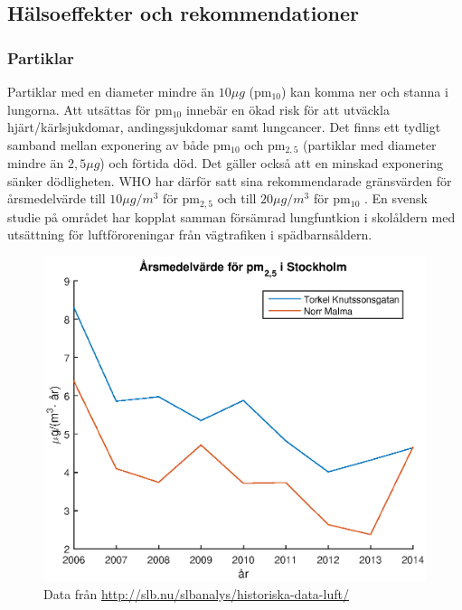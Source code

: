 \subsection{Hälsoeffekter och rekommendationer}
\subsubsection{Partiklar}
Partiklar med en diameter mindre än $10 \mu g$ (pm$_{10}$) kan komma ner och stanna i lungorna. Att utsättas för pm$_{10}$ innebär en ökad risk för att utväckla hjärt/kärlsjukdomar, andingssjukdomar samt lungcancer. Det finns ett tydligt samband mellan exponering av både pm$_{10}$ och pm$_{2,5}$ (partiklar med diameter mindre än $2,5 \mu g$) och förtida död. Det gäller också att en minskad exponering sänker dödligheten. WHO har därför satt sina rekommendarade gränsvärden för årsmedelvärde till $10 \mu g/m^3$ för pm$_{2,5}$ och till $20 \mu g/m^3$ för pm$_{10}$ \parencite{whoAir}.
En svensk studie på området har kopplat samman försämrad lungfuntkion i skolåldern med utsättning för luftföroreningar från vägtrafiken i spädbarnsåldern. \parencite{lungor}
\begin{figure}[H]
	\centering
	\includegraphics[width=.8\textwidth]{Bilder/pm25sth}
	\caption{Data från \url{http://slb.nu/slbanalys/historiska-data-luft/}}
	\label{fig:pm25sth}
\end{figure}

